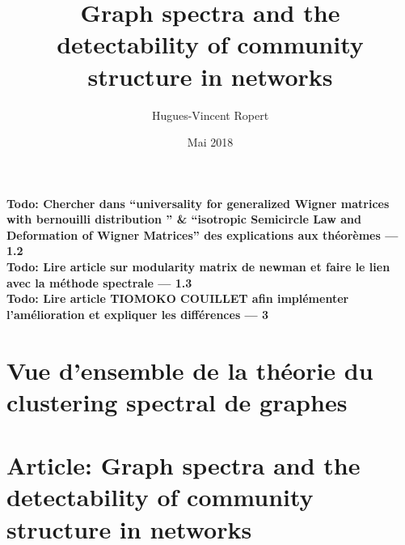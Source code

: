 \documentclass{article} %
\title{Graph spectra and the detectability of community structure in networks}
\author{Hugues-Vincent Ropert}
\date{Mai 2018}
\begin{document}
\maketitle

\textbf{Todo: Chercher dans ``universality for generalized Wigner matrices with bernouilli distribution '' \& ``isotropic Semicircle Law and Deformation of Wigner Matrices'' des explications aux théorèmes --- 1.2}\\

\textbf{Todo: Lire article sur modularity matrix de newman et faire le lien avec la méthode spectrale --- 1.3}\\

\textbf{Todo: Lire article TIOMOKO COUILLET afin implémenter l'amélioration et expliquer les différences --- 3}\\
\tableofcontents

\part{Vue d'ensemble de la théorie du clustering spectral de graphes}


\part{Article: Graph spectra and the detectability of community structure in networks}



\nocite{*}


\end{document}
